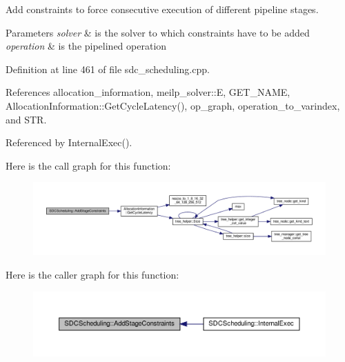 Add constraints to force consecutive execution of different pipeline stages. 


\begin{DoxyParams}{Parameters}
{\em solver} & is the solver to which constraints have to be added \\
\hline
{\em operation} & is the pipelined operation \\
\hline
\end{DoxyParams}


Definition at line 461 of file sdc\+\_\+scheduling.\+cpp.



References allocation\+\_\+information, meilp\+\_\+solver\+::E, G\+E\+T\+\_\+\+N\+A\+ME, Allocation\+Information\+::\+Get\+Cycle\+Latency(), op\+\_\+graph, operation\+\_\+to\+\_\+varindex, and S\+TR.



Referenced by Internal\+Exec().

Here is the call graph for this function\+:
\nopagebreak
\begin{figure}[H]
\begin{center}
\leavevmode
\includegraphics[width=350pt]{d4/dc5/classSDCScheduling_a39750be65287d266d7cf259d91667246_cgraph}
\end{center}
\end{figure}
Here is the caller graph for this function\+:
\nopagebreak
\begin{figure}[H]
\begin{center}
\leavevmode
\includegraphics[width=350pt]{d4/dc5/classSDCScheduling_a39750be65287d266d7cf259d91667246_icgraph}
\end{center}
\end{figure}
\mbox{\label{classSDCScheduling_aec06b6a8117baa3496c1ee294c4341ab}} 
